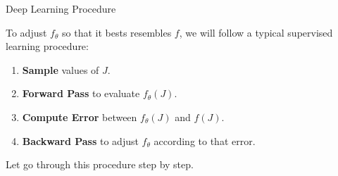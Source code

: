\documentclass[aspectratio=169, 12pt]{beamer}
\begin{document}
\begin{frame}{Deep Learning Procedure}

    To adjust $f_\theta$ so that it bests resembles $f$, we will follow a typical supervised learning procedure:
    \begin{enumerate}
        \item \textbf{Sample} values of $J$. 
        \item \textbf{Forward Pass} to evaluate $f_\theta(J)$. 
        \item \textbf{Compute Error} between $f_\theta(J)$ and $f(J)$. 
        \item \textbf{Backward Pass} to adjust $f_\theta$ according to that error. 
    \end{enumerate}

    Let go through this procedure step by step. 

\end{frame}
\end{document}
